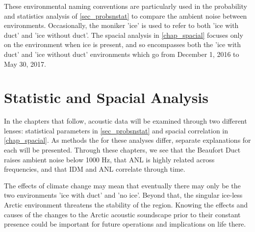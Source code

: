 These environmental naming conventions are particularly used in the probability and statistics analysis of \autoref{sec_probsnstat} to compare the ambient noise between environments. Occasionally, the moniker 'ice' is used to refer to both 'ice with duct' and 'ice without duct'. The spacial analysis in \autoref{chap_spacial} focuses only on the environment when ice is present, and so encompasses both the 'ice with duct' and 'ice without duct' environments which go from December 1, 2016 to May 30, 2017. 


\section{Statistic and Spacial Analysis}

In the chapters that follow, acoustic data will be examined through two different lenses: statistical parameters in \autoref{sec_probsnstat} and spacial correlation in \autoref{chap_spacial}. As methods the for these analyses differ, separate explanations for each will be presented. Through these chapters, we see that the Beaufort Duct raises ambient noise below 1000 Hz, that ANL is highly related across frequencies, and that IDM and ANL correlate through time.

The effects of climate change may mean that eventually there may only be the two environments 'ice with duct' and 'no ice'. Beyond that, the singular ice-less Arctic environment threatens the stability of the region. Knowing the effects and causes of the changes to the Arctic acoustic soundscape prior to their constant presence could be important for future operations and implications on life there. 

